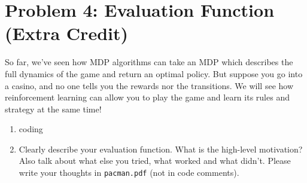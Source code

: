 \documentclass[10pt]{article}
\begin{document}
\section*{\normalsize Problem 4: Evaluation Function (Extra Credit)}

So far, we've seen how MDP algorithms can take an MDP which describes the full dynamics of the game and return an optimal policy. But suppose you go into a casino, and no one tells you the rewards nor the transitions. We will see how reinforcement learning can allow you to play the game and learn its rules and strategy at the same time!

\begin{enumerate}[label=(\alph*)]

  \item coding
  
  \item Clearly describe your evaluation function. What is the high-level motivation? Also talk about what else you tried, what worked and what didn't. Please write your thoughts in \texttt{pacman.pdf} (not in code comments).
		
\end{enumerate}
\end{document}

